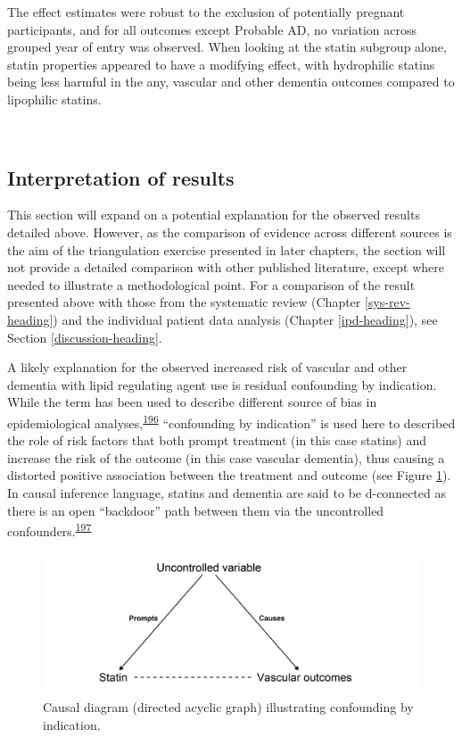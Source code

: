 \documentclass[a4paper, twoside]{templates/ociamthesis}
\begin{document}
The effect estimates were robust to the exclusion of potentially pregnant participants, and for all outcomes except Probable AD, no variation across grouped year of entry was observed. When looking at the statin subgroup alone, statin properties appeared to have a modifying effect, with hydrophilic statins being less harmful in the any, vascular and other dementia outcomes compared to lipophilic statins.

~

\hypertarget{interpretation-of-results}{%
\subsection{Interpretation of results}\label{interpretation-of-results}}

This section will expand on a potential explanation for the observed results detailed above. However, as the comparison of evidence across different sources is the aim of the triangulation exercise presented in later chapters, the section will not provide a detailed comparison with other published literature, except where needed to illustrate a methodological point. For a comparison of the result presented above with those from the systematic review (Chapter \ref{sys-rev-heading}) and the individual patient data analysis (Chapter \ref{ipd-heading}), see Section \ref{discussion-heading}.

A likely explanation for the observed increased risk of vascular and other dementia with lipid regulating agent use is residual confounding by indication. While the term has been used to describe different source of bias in epidemiological analyses,\textsuperscript{\protect\hyperlink{ref-salas1999}{196}} ``confounding by indication'' is used here to described the role of risk factors that both prompt treatment (in this case statins) and increase the risk of the outcome (in this case vascular dementia), thus causing a distorted positive association between the treatment and outcome (see Figure \ref{fig:indicationBias}). In causal inference language, statins and dementia are said to be d-connected as there is an open ``backdoor'' path between them via the uncontrolled confounders.\textsuperscript{\protect\hyperlink{ref-suttorp2015}{197}}





\begin{figure}[H]
\includegraphics[width=1\linewidth]{figures/cprd-analysis/indicationBias} \caption[Confounding by indication causal diagram]{Causal diagram (directed acyclic graph) illustrating confounding by indication.}\label{fig:indicationBias}
\end{figure}
\end{document}
